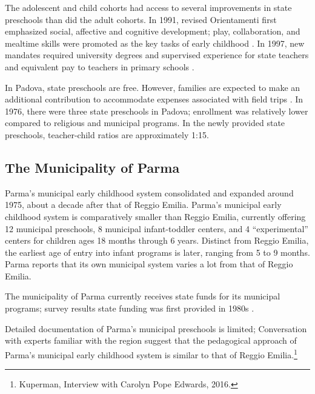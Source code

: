 The adolescent and child cohorts had access to several improvements in state preschools than did the adult cohorts. In 1991, revised Orientamenti first emphasized social, affective and cognitive development; play, collaboration, and mealtime skills were promoted as the key tasks of early childhood \citep{Corsaro_1996_Early-Edu}. In 1997, new mandates required university degrees and supervised experience for state teachers and equivalent pay to teachers in primary schools \citep{Ghedini_2001_Ital-Natl-Policy}.

In Padova, state preschools are free. However, families are expected to make an additional contribution to accommodate expenses associated with field trips \citep{CEHD_2016_Historical-Analysis}. In 1976, there were three state preschools in Padova; enrollment was relatively lower compared to religious and municipal programs. In the newly provided state preschools, teacher-child ratios are approximately 1:15.

\subsection{The Municipality of Parma}

Parma's municipal early childhood system consolidated and expanded around 1975, about a decade after that of Reggio Emilia. Parma's municipal early childhood system is comparatively smaller than Reggio Emilia, currently offering 12 municipal preschools, 8 municipal infant-toddler centers, and 4 ``experimental'' centers for children ages 18 months through 6 years. Distinct from Reggio Emilia, the earliest age of entry into infant programs is later, ranging from 5 to 9 months. Parma reports that its own municipal system varies a lot from that of Reggio Emilia.

The municipality of Parma currently receives state funds for its municipal programs; survey results state funding was first provided in 1980s \citep{CEHD_2016_Historical-Analysis}.

Detailed documentation of Parma's municipal preschools is limited; Conversation with experts familiar with the region suggest that the pedagogical approach of Parma's municipal early childhood system is similar to that of Reggio Emilia.\footnote{Kuperman, Interview with Carolyn Pope Edwards, 2016.}


